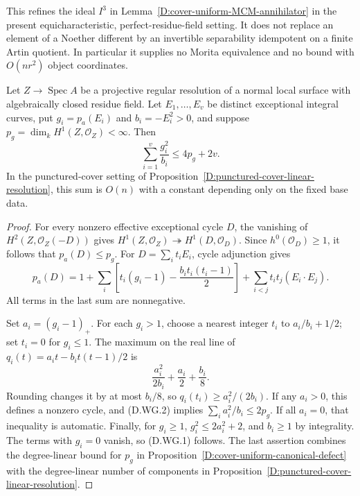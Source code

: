 \begin{remark}
This refines the ideal $I^3$ in
Lemma~\ref{D:cover-uniform-MCM-annihilator} in the present
equicharacteristic, perfect-residue-field setting. It does not replace
an element of a Noether different by an invertible separability
idempotent on a finite Artin quotient. In particular it supplies no
Morita equivalence and no bound with $O(nr^2)$ object coordinates.
\end{remark}

\begin{lemma}
\label{D:exceptional-weighted-genus}
Let $Z\to\operatorname{Spec}A$ be a projective regular resolution of a
normal local surface with algebraically closed residue field. Let
$E_1,\ldots,E_v$ be distinct exceptional integral curves, put
$g_i=p_a(E_i)$ and $b_i=-E_i^2>0$, and suppose
$p_g=\dim_kH^1(Z,\mathcal O_Z)<\infty$. Then
\[
                  \sum_{i=1}^{v}\frac{g_i^2}{b_i}
                  \le 4p_g+2v.                         \tag{D.WG.1}
\]
In the punctured-cover setting of
Proposition~\ref{D:punctured-cover-linear-resolution}, this sum is
$O(n)$ with a constant depending only on the fixed base data.
\end{lemma}
\begin{proof}
For every nonzero effective exceptional cycle $D$, the vanishing of
$H^2(Z,\mathcal O_Z(-D))$ gives
$H^1(Z,\mathcal O_Z)\twoheadrightarrow H^1(D,\mathcal O_D)$.
Since $h^0(\mathcal O_D)\ge1$, it follows that $p_a(D)\le p_g$.
For $D=\sum_i t_iE_i$, cycle adjunction gives
\[
 p_a(D)=1+\sum_i\left[t_i(g_i-1)
               -\frac{b_i t_i(t_i-1)}2\right]
               +\sum_{i<j}t_it_j(E_i\cdot E_j).          \tag{D.WG.2}
\]
All terms in the last sum are nonnegative.

Set $a_i=(g_i-1)_+$. For each $g_i>1$, choose a nearest integer
$t_i$ to $a_i/b_i+1/2$; set $t_i=0$ for $g_i\le1$.
The maximum on the real line of
$q_i(t)=a_it-b_it(t-1)/2$ is
\[
 \frac{a_i^2}{2b_i}+\frac{a_i}{2}+\frac{b_i}{8}.
\]
Rounding changes it by at most $b_i/8$, so
$q_i(t_i)\ge a_i^2/(2b_i)$. If any $a_i>0$, this defines a nonzero
cycle, and (D.WG.2) implies
$\sum_i a_i^2/b_i\le2p_g$. If all $a_i=0$, that inequality is
automatic. Finally, for $g_i\ge1$,
$g_i^2\le2a_i^2+2$, and $b_i\ge1$ by integrality. The terms with
$g_i=0$ vanish, so (D.WG.1) follows. The last assertion combines the
degree-linear bound for $p_g$ in
Proposition~\ref{D:cover-uniform-canonical-defect} with the
degree-linear number of components in
Proposition~\ref{D:punctured-cover-linear-resolution}.
\end{proof}
